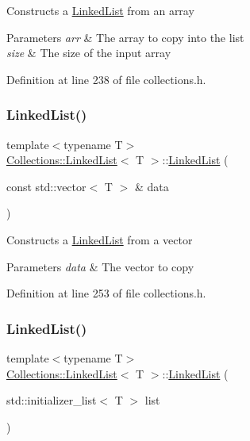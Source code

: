 Constructs a \hyperlink{class_collections_1_1_linked_list}{Linked\+List} from an array 
\begin{DoxyParams}{Parameters}
{\em arr} & The array to copy into the list \\
\hline
{\em size} & The size of the input array \\
\hline
\end{DoxyParams}


Definition at line 238 of file collections.\+h.

\hypertarget{class_collections_1_1_linked_list_a598749544a328460effd5e63dd6ba3cc}{}\label{class_collections_1_1_linked_list_a598749544a328460effd5e63dd6ba3cc} 
\subsubsection{\texorpdfstring{Linked\+List()}{LinkedList()}\hspace{0.1cm}{\footnotesize\ttfamily [5/6]}}
{\footnotesize\ttfamily template$<$typename T$>$ \\
\hyperlink{class_collections_1_1_linked_list}{Collections\+::\+Linked\+List}$<$ T $>$\+::\hyperlink{class_collections_1_1_linked_list}{Linked\+List} (\begin{DoxyParamCaption}\item[{const std\+::vector$<$ T $>$ \&}]{data }\end{DoxyParamCaption})}

Constructs a \hyperlink{class_collections_1_1_linked_list}{Linked\+List} from a vector 
\begin{DoxyParams}{Parameters}
{\em data} & The vector to copy \\
\hline
\end{DoxyParams}


Definition at line 253 of file collections.\+h.

\hypertarget{class_collections_1_1_linked_list_aacebe14f1bc1a6c671b51f01b021f772}{}\label{class_collections_1_1_linked_list_aacebe14f1bc1a6c671b51f01b021f772} 
\subsubsection{\texorpdfstring{Linked\+List()}{LinkedList()}\hspace{0.1cm}{\footnotesize\ttfamily [6/6]}}
{\footnotesize\ttfamily template$<$typename T$>$ \\
\hyperlink{class_collections_1_1_linked_list}{Collections\+::\+Linked\+List}$<$ T $>$\+::\hyperlink{class_collections_1_1_linked_list}{Linked\+List} (\begin{DoxyParamCaption}\item[{std\+::initializer\+\_\+list$<$ T $>$}]{list }\end{DoxyParamCaption})}




